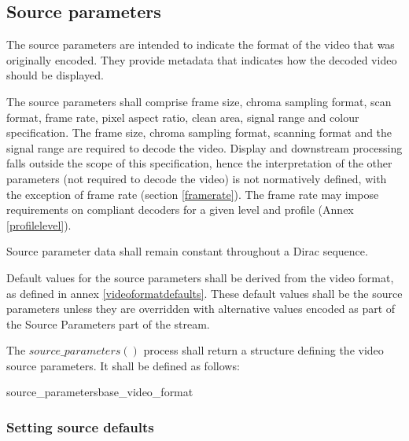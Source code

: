 \subsection{Source parameters}
\label{sourceparameters}

The source parameters are intended to indicate the format of the video that was 
originally encoded. They provide metadata that indicates how the decoded video
should be displayed. 

The source parameters shall comprise frame size, chroma sampling format, 
scan format, frame rate, pixel aspect ratio, clean area, signal range 
and colour specification. The frame size, chroma sampling  format, 
scanning format and the signal range are required to decode the video. Display 
and downstream processing falls outside the scope of this specification, 
hence the interpretation of the other parameters (not required to decode 
the video) is not normatively defined, with the exception of frame rate 
(section \ref{framerate}). The frame rate may impose requirements on
 compliant decoders for a given level and profile (Annex \ref{profilelevel}).

Source parameter data shall remain constant throughout a Dirac sequence. 

Default values for the source parameters shall be derived from the video 
format, as defined in annex \ref{videoformatdefaults}. These default 
values shall be the source parameters unless they are overridden 
with alternative values encoded 
as part of the Source Parameters part of the stream. 

The $source\_parameters()$ process shall return a structure defining 
the video source parameters. It shall be defined as follows:

\begin{pseudo}{source\_parameters}{base\_video\_format}
\bsRET{\VideoParams}
\end{pseudo}

\subsubsection{Setting source defaults}
\label{setsourcedefaults}


